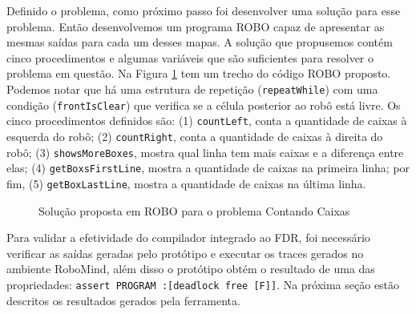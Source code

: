 Definido o problema, como próximo passo foi desenvolver uma solução para esse problema. Então desenvolvemos um programa ROBO capaz de apresentar as mesmas saídas para cada um desses mapas. A solução que propusemos contém cinco procedimentos e algumas variáveis que são suficientes para resolver o problema em questão. Na Figura \ref{fig:solution} tem um trecho do código ROBO proposto. Podemos notar que há uma estrutura de repetição (\texttt{repeatWhile}) com uma condição (\texttt{frontIsClear}) que verifica se a célula posterior ao robô está livre. Os cinco procedimentos definidos são: (1) \texttt{countLeft}, conta a quantidade de caixas à esquerda do robô; (2) \texttt{countRight}, conta a quantidade de caixas à direita do robô; (3) \texttt{showsMoreBoxes}, mostra qual linha tem mais caixas e a diferença entre elas; (4) \texttt{getBoxsFirstLine}, mostra a quantidade de caixas na primeira linha; por fim, (5) \texttt{getBoxLastLine}, mostra a quantidade de caixas na última linha.

\begin{figure}[h]
\centering
\caption{Solução proposta em ROBO para o problema Contando Caixas}

\label{fig:solution}
\end{figure}

Para validar a efetividade do compilador integrado ao FDR, foi necessário verificar as saídas geradas pelo protótipo e executar os traces gerados no ambiente RoboMind, além disso o protótipo obtém o resultado de uma das propriedades: \texttt{assert PROGRAM :[deadlock free [F]]}. Na próxima seção estão descritos os resultados gerados pela ferramenta.

